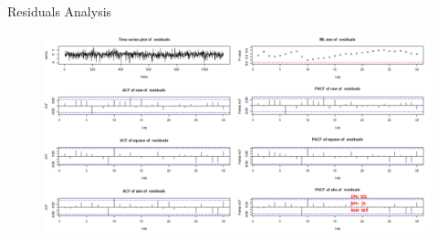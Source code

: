 \documentclass{beamer}
\begin{document}
\begin{frame}{Residuals Analysis}
  \begin{figure}[htp]
    \centering
    \includegraphics[width = \columnwidth]{fig/res acf pacf plot.png}
    \label{fig:res plot}
  \end{figure}
\end{frame}
\end{document}
